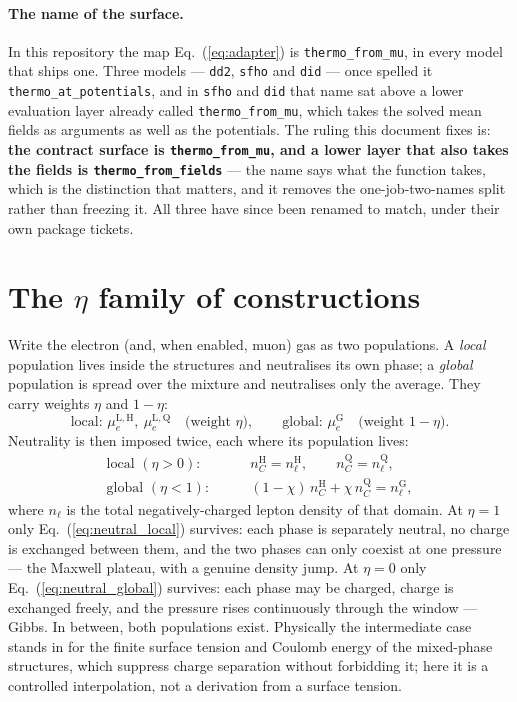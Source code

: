 \documentclass[aps,prc,onecolumn,superscriptaddress,nofootinbib,10pt]{revtex4-2}
\newcommand{\nC}{n_C}
\newcommand{\phH}{\mathrm{H}}
\newcommand{\phQ}{\mathrm{Q}}
\begin{document}
\paragraph{The name of the surface.} In this repository the map
Eq.~(\ref{eq:adapter}) is \texttt{thermo\_from\_mu}, in every model that ships
one. Three models --- \texttt{dd2}, \texttt{sfho} and \texttt{did} --- once spelled
it \texttt{thermo\_at\_potentials}, and in \texttt{sfho} and \texttt{did} that
name sat above a lower evaluation layer already called
\texttt{thermo\_from\_mu}, which takes the solved mean fields as arguments as
well as the potentials. The ruling this document fixes is: \textbf{the contract
surface is \texttt{thermo\_from\_mu}, and a lower layer that also takes the
fields is \texttt{thermo\_from\_fields}} --- the name says what the function
takes, which is the distinction that matters, and it removes the
one-job-two-names split rather than freezing it. All three have since been
renamed to match, under their own package tickets.

\section{The $\eta$ family of constructions}

Write the electron (and, when enabled, muon) gas as two populations. A
\emph{local} population lives inside the structures and neutralises its own
phase; a \emph{global} population is spread over the mixture and neutralises
only the average. They carry weights $\eta$ and $1-\eta$:
%
\begin{equation}
\text{local: } \mu_e^{\mathrm{L},\phH},\ \mu_e^{\mathrm{L},\phQ}
\quad \text{(weight } \eta),
\qquad
\text{global: } \mu_e^{\mathrm{G}}
\quad \text{(weight } 1-\eta).
\label{eq:leptonsplit}
\end{equation}
%
Neutrality is then imposed twice, each where its population lives:
%
\begin{align}
\text{local } (\eta > 0): &\qquad
   \nC^\phH = n_\ell^\phH , \qquad \nC^\phQ = n_\ell^\phQ ,
\label{eq:neutral_local} \\
\text{global } (\eta < 1): &\qquad
   (1-\chi)\, \nC^\phH + \chi\, \nC^\phQ = n_\ell^{\mathrm{G}} ,
\label{eq:neutral_global}
\end{align}
%
where $n_\ell$ is the total negatively-charged lepton density of that domain.
At $\eta = 1$ only Eq.~(\ref{eq:neutral_local}) survives: each phase is
separately neutral, no charge is exchanged between them, and the two phases
can only coexist at one pressure --- the Maxwell plateau, with a genuine
density jump. At $\eta = 0$ only Eq.~(\ref{eq:neutral_global}) survives: each
phase may be charged, charge is exchanged freely, and the pressure rises
continuously through the window --- Gibbs. In between, both populations
exist. Physically the intermediate case stands in for the finite surface
tension and Coulomb energy of the mixed-phase structures, which suppress
charge separation without forbidding it; here it is a controlled
interpolation, not a derivation from a surface tension.
\end{document}
